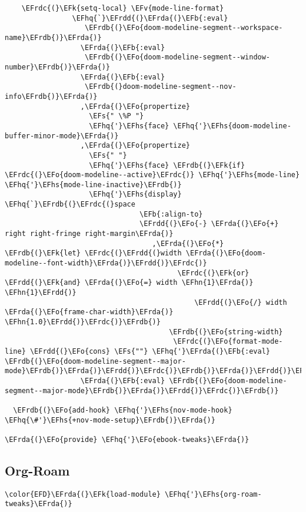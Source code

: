 \documentclass[a4wide,10pt]{article}
\newcommand{\EFs}[1]{\textcolor{EFs}{#1}} %
\newcommand{\EFk}[1]{\textcolor{EFk}{#1}} %
\newcommand{\EFb}[1]{\textcolor{EFb}{#1}} %
\newcommand{\EFv}[1]{\textcolor{EFv}{#1}} %
\newcommand{\EFo}[1]{\textcolor{EFo}{#1}} %
\newcommand{\EFhn}[1]{\textcolor{EFhn}{\textbf{#1}}} %
\newcommand{\EFhq}[1]{\textcolor{EFhq}{#1}} %
\newcommand{\EFhs}[1]{\textcolor{EFhs}{#1}} %
\newcommand{\EFrda}[1]{\textcolor{EFrda}{#1}} %
\newcommand{\EFrdb}[1]{\textcolor{EFrdb}{#1}} %
\newcommand{\EFrdc}[1]{\textcolor{EFrdc}{#1}} %
\newcommand{\EFrdd}[1]{\textcolor{EFrdd}{#1}} %
\begin{document}
\begin{Code}
\begin{Verbatim}
    \EFrdc{(}\EFk{setq-local} \EFv{mode-line-format}
                \EFhq{`}\EFrdd{(}\EFrda{(}\EFb{:eval}
                   \EFrdb{(}\EFo{doom-modeline-segment--workspace-name}\EFrdb{)}\EFrda{)}
                  \EFrda{(}\EFb{:eval}
                   \EFrdb{(}\EFo{doom-modeline-segment--window-number}\EFrdb{)}\EFrda{)}
                  \EFrda{(}\EFb{:eval}
                   \EFrdb{(}doom-modeline-segment--nov-info\EFrdb{)}\EFrda{)}
                  ,\EFrda{(}\EFo{propertize}
                    \EFs{" \%P "}
                    \EFhq{'}\EFhs{face} \EFhq{'}\EFhs{doom-modeline-buffer-minor-mode}\EFrda{)}
                  ,\EFrda{(}\EFo{propertize}
                    \EFs{" "}
                    \EFhq{'}\EFhs{face} \EFrdb{(}\EFk{if} \EFrdc{(}\EFo{doom-modeline--active}\EFrdc{)} \EFhq{'}\EFhs{mode-line} \EFhq{'}\EFhs{mode-line-inactive}\EFrdb{)}
                    \EFhq{'}\EFhs{display} \EFhq{`}\EFrdb{(}\EFrdc{(}space
                                \EFb{:align-to}
                                \EFrdd{(}\EFo{-} \EFrda{(}\EFo{+} right right-fringe right-margin\EFrda{)}
                                   ,\EFrda{(}\EFo{*} \EFrdb{(}\EFk{let} \EFrdc{(}\EFrdd{(}width \EFrda{(}\EFo{doom-modeline--font-width}\EFrda{)}\EFrdd{)}\EFrdc{)}
                                         \EFrdc{(}\EFk{or} \EFrdd{(}\EFk{and} \EFrda{(}\EFo{=} width \EFhn{1}\EFrda{)} \EFhn{1}\EFrdd{)}
                                             \EFrdd{(}\EFo{/} width \EFrda{(}\EFo{frame-char-width}\EFrda{)} \EFhn{1.0}\EFrdd{)}\EFrdc{)}\EFrdb{)}
                                       \EFrdb{(}\EFo{string-width}
                                        \EFrdc{(}\EFo{format-mode-line} \EFrdd{(}\EFo{cons} \EFs{""} \EFhq{'}\EFrda{(}\EFb{:eval} \EFrdb{(}\EFo{doom-modeline-segment--major-mode}\EFrdb{)}\EFrda{)}\EFrdd{)}\EFrdc{)}\EFrdb{)}\EFrda{)}\EFrdd{)}\EFrdc{)}\EFrdb{)}\EFrda{)}
                  \EFrda{(}\EFb{:eval} \EFrdb{(}\EFo{doom-modeline-segment--major-mode}\EFrdb{)}\EFrda{)}\EFrdd{)}\EFrdc{)}\EFrdb{)}

  \EFrdb{(}\EFo{add-hook} \EFhq{'}\EFhs{nov-mode-hook} \EFhq{\#'}\EFhs{+nov-mode-setup}\EFrdb{)}\EFrda{)}

\EFrda{(}\EFo{provide} \EFhq{'}\EFo{ebook-tweaks}\EFrda{)}
\end{Verbatim}
\end{Code}

\subsection{Org-Roam}
\label{sec:org384210a}
\begin{Code}
\begin{Verbatim}
\color{EFD}\EFrda{(}\EFk{load-module} \EFhq{'}\EFhs{org-roam-tweaks}\EFrda{)}
\end{Verbatim}
\end{Code}
\end{document}
